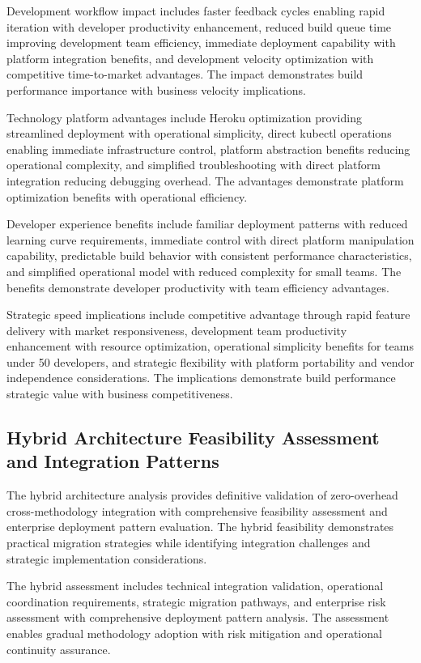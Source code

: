 Development workflow impact includes faster feedback cycles enabling rapid iteration with developer productivity enhancement, reduced build queue time improving development team efficiency, immediate deployment capability with platform integration benefits, and development velocity optimization with competitive time-to-market advantages. The impact demonstrates build performance importance with business velocity implications.

Technology platform advantages include Heroku optimization providing streamlined deployment with operational simplicity, direct kubectl operations enabling immediate infrastructure control, platform abstraction benefits reducing operational complexity, and simplified troubleshooting with direct platform integration reducing debugging overhead. The advantages demonstrate platform optimization benefits with operational efficiency.

Developer experience benefits include familiar deployment patterns with reduced learning curve requirements, immediate control with direct platform manipulation capability, predictable build behavior with consistent performance characteristics, and simplified operational model with reduced complexity for small teams. The benefits demonstrate developer productivity with team efficiency advantages.

Strategic speed implications include competitive advantage through rapid feature delivery with market responsiveness, development team productivity enhancement with resource optimization, operational simplicity benefits for teams under 50 developers, and strategic flexibility with platform portability and vendor independence considerations. The implications demonstrate build performance strategic value with business competitiveness.


\subsection{Hybrid Architecture Feasibility Assessment and Integration Patterns}
\label{subsec:hybrid_architecture}

The hybrid architecture analysis provides definitive validation of zero-overhead cross-methodology integration with comprehensive feasibility assessment and enterprise deployment pattern evaluation. The hybrid feasibility demonstrates practical migration strategies while identifying integration challenges and strategic implementation considerations.

The hybrid assessment includes technical integration validation, operational coordination requirements, strategic migration pathways, and enterprise risk assessment with comprehensive deployment pattern analysis. The assessment enables gradual methodology adoption with risk mitigation and operational continuity assurance.


